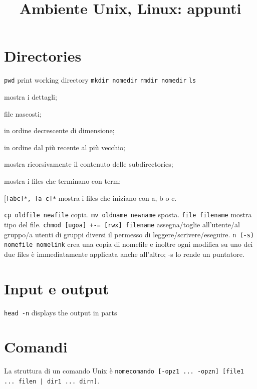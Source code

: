 \documentclass{article}
\begin{document}
\title{Ambiente Unix, Linux: appunti}

\maketitle

\section{Directories}
\texttt{pwd} print working directory\newline
\texttt{mkdir nomedir}\newline
\texttt{rmdir nomedir}\newline
\texttt{ls}
\begin{description}
 \item[\texttt{-l}] mostra i dettagli;
 \item[\texttt{-a}] file nascosti;
 \item[\texttt{-ls}] in ordine decrescente di dimensione;
 \item[\texttt{-lt}] in ordine dal pi\`u recente al pi\`u vecchio;
 \item[\texttt{-R}] mostra ricorsivamente il contenuto delle subdirectories;
 \item[\texttt{*term}] mostra i files che terminano con term;
 \item[\texttt{[abc]*, [a-c]*} mostra i files che iniziano con a, b o c.
\end{description}
\texttt{cp oldfile newfile} copia.\newline
\texttt{mv oldname newname} sposta.\newline
\texttt{file filename} mostra tipo del file.\newline
\texttt{chmod [ugoa] +-= [rwx] filename} assegna/toglie all'utente/al gruppo/a utenti di gruppi diversi il permesso di leggere/scrivere/eseguire.\newline
\texttt{n (-s) nomefile nomelink} crea una copia  di nomefile e inoltre ogni modifica su uno dei due files è immediatamente applicata anche all'altro; -s lo rende un puntatore.\newline

\section{Input e output}
\texttt{head -n}
 displays the output in parts


\section{Comandi}
La struttura di un comando Unix è \texttt{nomecomando [-opz1 ... -opzn] [file1 ... filen | dir1 ... dirn]}.
\end{document}
